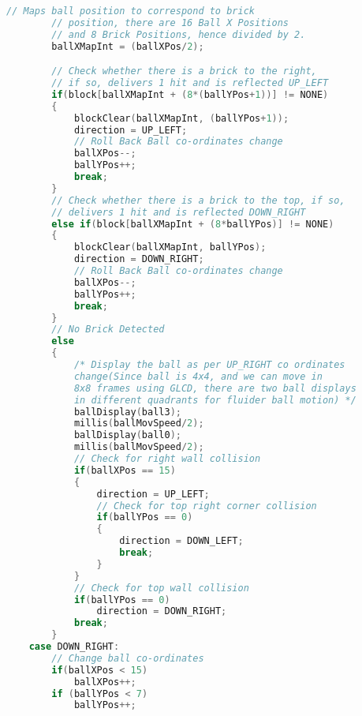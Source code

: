 \documentclass{article}
\begin{document}
\begin{lstlisting}[basicstyle = \small, language = C]
        // Maps ball position to correspond to brick 
        // position, there are 16 Ball X Positions
        // and 8 Brick Positions, hence divided by 2.
        ballXMapInt = (ballXPos/2);

        // Check whether there is a brick to the right, 
        // if so, delivers 1 hit and is reflected UP_LEFT
        if(block[ballXMapInt + (8*(ballYPos+1))] != NONE)
        {
            blockClear(ballXMapInt, (ballYPos+1));
            direction = UP_LEFT;
            // Roll Back Ball co-ordinates change
            ballXPos--;
            ballYPos++;
            break;
        }
        // Check whether there is a brick to the top, if so, 
        // delivers 1 hit and is reflected DOWN_RIGHT
        else if(block[ballXMapInt + (8*ballYPos)] != NONE)
        {
            blockClear(ballXMapInt, ballYPos);
            direction = DOWN_RIGHT;
            // Roll Back Ball co-ordinates change
            ballXPos--;
            ballYPos++;
            break;
        }
        // No Brick Detected
        else
        {
            /* Display the ball as per UP_RIGHT co ordinates 
            change(Since ball is 4x4, and we can move in 
            8x8 frames using GLCD, there are two ball displays 
            in different quadrants for fluider ball motion) */
            ballDisplay(ball3);
            millis(ballMovSpeed/2);
            ballDisplay(ball0);
            millis(ballMovSpeed/2);
            // Check for right wall collision
            if(ballXPos == 15)
            {
                direction = UP_LEFT;
                // Check for top right corner collision
                if(ballYPos == 0)
                {
                    direction = DOWN_LEFT;
                    break;
                }
            }
            // Check for top wall collision
            if(ballYPos == 0)
                direction = DOWN_RIGHT;
            break;
        }
    case DOWN_RIGHT:
        // Change ball co-ordinates
        if(ballXPos < 15)
            ballXPos++;
        if (ballYPos < 7)
            ballYPos++;


\end{lstlisting}
\end{document}
